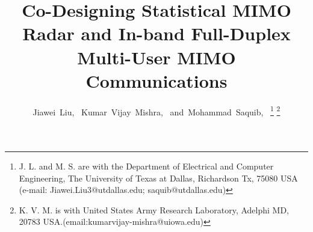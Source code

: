 \documentclass[9pt,journal]{IEEEtran}
\theoremstyle{definition}
\begin{document}
	\title{Co-Designing Statistical MIMO Radar and In-band Full-Duplex Multi-User MIMO Communications}
	\author{Jiawei~Liu,~
		Kumar~Vijay~Mishra,~
		and~Mohammad~Saquib,~
		\vspace{-24pt}%
		\thanks{J. L. and M. S. are with the Department
			of Electrical and Computer Engineering, The University of Texas at Dallas, Richardson
			Tx, 75080 USA (e-mail: Jiawei.Liu3@utdallas.edu; saquib@utdallas.edu)}%
		\thanks{K. V. M. is with United States Army Research Laboratory, Adelphi MD, 20783 USA.(email:kumarvijay-mishra@uiowa.edu)}%
}
	
	
	
	
	
	
	
	
	
	
	
	
	\maketitle
	
\end{document}
